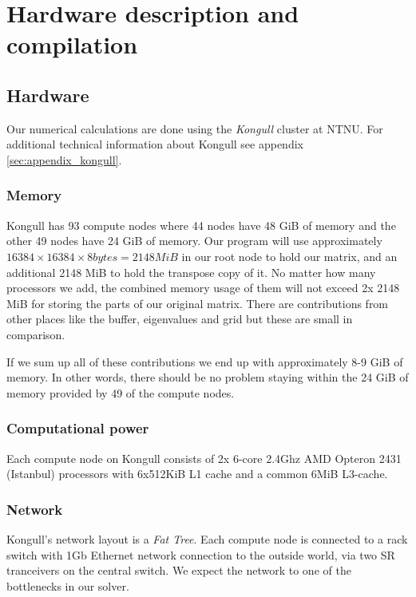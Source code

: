 
\clearpage
\section{Hardware description and compilation} %
\label{sec:hardware_and_compilation}

\subsection{Hardware} %
\label{sub:hardware}
Our numerical calculations are done using the \emph{Kongull} cluster at NTNU. For additional technical information about Kongull see appendix \ref{sec:appendix_kongull}.

\subsubsection{Memory} %
\label{ssub:memory}
Kongull has 93 compute nodes where 44 nodes have 48 GiB of memory and the other 49 nodes have 24 GiB of memory. Our program will use approximately $16384 \times 16384 \times 8 bytes = 2148 MiB$ in our root node to hold our matrix, and an additional 2148 MiB to hold the transpose copy of it. No matter how many processors we add, the combined memory usage of them will not exceed 2x 2148 MiB for storing the parts of our original matrix. There are contributions from other places like the buffer, eigenvalues and grid but these are small in comparison.

If we sum up all of these contributions we end up with approximately 8-9 GiB of memory. In other words, there should be no problem staying within the 24 GiB of memory provided by 49 of the compute nodes.

\subsubsection{Computational power} %
\label{ssub:subsubsection_name}
Each compute node on Kongull consists of 2x 6-core 2.4Ghz AMD Opteron 2431 (Istanbul) processors with 6x512KiB L1 cache and a common 6MiB L3-cache.

\subsubsection{Network} %
\label{ssub:network}
Kongull's network layout is a \emph{Fat Tree}. Each compute node is connected to a rack switch with 1Gb Ethernet network connection to the outside world, via two SR tranceivers on the central switch. We expect the network to one of the bottlenecks in our solver.

